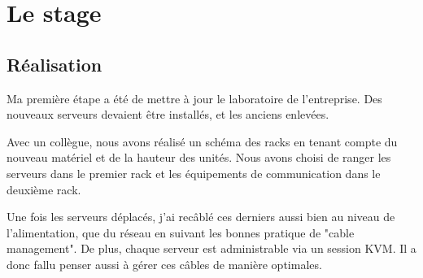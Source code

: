 \section{Le stage}

\subsection{Réalisation}
Ma première étape a été de mettre à jour le laboratoire de l'entreprise.
Des nouveaux serveurs devaient être installés, et les anciens enlevées.

Avec un collègue, nous avons réalisé un schéma des racks en tenant compte du nouveau matériel et de la hauteur des unités.
Nous avons choisi de ranger les serveurs dans le premier rack et les équipements de communication dans le deuxième rack. 

Une fois les serveurs déplacés, j'ai recâblé ces derniers aussi bien au niveau de l'alimentation, que du réseau en suivant les bonnes pratique de "cable management".
De plus, chaque serveur est administrable via un session KVM.
Il a donc fallu penser aussi à gérer ces câbles de manière optimales.